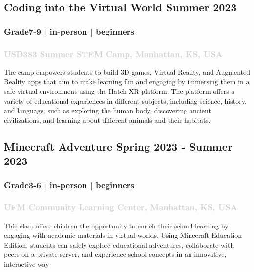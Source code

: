 \documentclass[11pt]{article}
\begin{document}
\label{sec: VR} 
   \vspace{0.8em} %
\subsection{ Coding into the Virtual World \hfill  \normalfont Summer 2023 } 
 \subsubsection{ Grade7-9 | in-person | beginners   }
  \subsubsection{ \textcolor{lightgray}{\normalfont USD383 Summer STEM Camp, Manhattan, KS, USA   }}
 \vspace{0.2em} %
  \noindent The camp empowers students to build 3D games, Virtual Reality, and Augmented Reality apps that aim to make learning fun and engaging by immersing them in a safe virtual environment using the Hatch XR platform. The platform offers a variety of educational experiences in different subjects, including science, history, and language, such as exploring the human body, discovering ancient civilizations, and learning about different animals and their habitats. 
\vspace{0.8em} %


\label{sec: Minecraft1} 
\subsection{ Minecraft Adventure \hfill  \normalfont  Spring 2023 - Summer 2023 } 
 \subsubsection{ Grade3-6 | in-person | beginners   }
  \subsubsection{ \textcolor{lightgray}{\normalfont UFM Community Learning Center, Manhattan, KS, USA   }}
 \vspace{0.2em} %
  \noindent This class offers children the opportunity to enrich their school learning by engaging with academic materials in virtual worlds. Using Minecraft Education Edition, students can safely explore educational adventures, collaborate with peers on a private server, and experience school concepts in an innovative, interactive way
\vspace{0.8em} %
\end{document}
